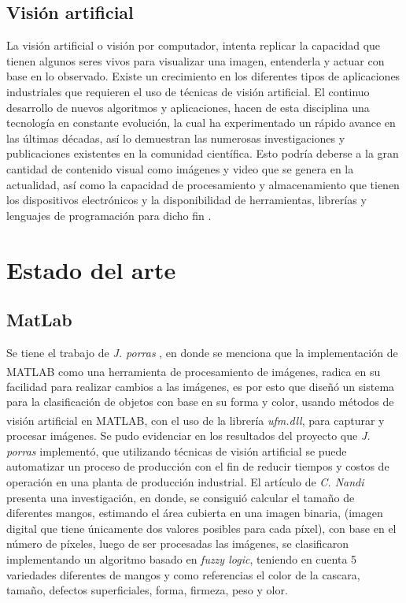 \section{Visión artificial} La visión artificial o visión por computador, intenta replicar la capacidad que tienen algunos seres vivos para visualizar una imagen, entenderla y actuar con base en lo observado. Existe un crecimiento en los diferentes tipos de aplicaciones industriales que requieren el uso de técnicas de visión artificial. El  continuo  desarrollo  de  nuevos  algoritmos  y  aplicaciones,  hacen  de  esta  disciplina  una tecnología en constante evolución, la cual ha experimentado un rápido avance en las últimas décadas, así lo demuestran las numerosas investigaciones y publicaciones existentes en la comunidad científica.  Esto podría deberse a la gran cantidad de contenido visual como imágenes y video que se genera en  la  actualidad,  así  como  la  capacidad  de  procesamiento  y  almacenamiento  que  tienen  los dispositivos electrónicos y la disponibilidad de herramientas, librerías y lenguajes de programación para dicho fin \cite{ref_15}.






\chapter{Estado del arte}

\section{MatLab}

Se tiene el trabajo de \textit{J. porras} \cite{article3}, en donde se menciona que la implementación de MATLAB\textsuperscript{\textregistered} como una herramienta de procesamiento de imágenes, radica en su facilidad para realizar cambios a las imágenes, es por esto que diseñó un sistema para la clasificación de objetos con base en su forma y color, usando métodos de visión artificial en MATLAB\textsuperscript{\textregistered}, con el uso de la librería \textit{ufm.dll}, para capturar y procesar imágenes. Se pudo evidenciar en los resultados del proyecto que \textit{J. porras} implementó, que utilizando técnicas de visión artificial se puede automatizar un proceso de producción con el fin de reducir tiempos y costos de operación en una planta de producción industrial. El artículo de \textit{C. Nandi} \cite{inproceedings} presenta una investigación, en donde, se consiguió calcular el tamaño de diferentes mangos, estimando el área cubierta en una imagen binaria, (imagen digital que tiene únicamente dos valores posibles para cada píxel), con base en el número de píxeles, luego de ser procesadas las imágenes, se clasificaron implementando un algoritmo basado en \textit{fuzzy logic}, teniendo en cuenta 5 variedades diferentes de mangos y como referencias el color de la cascara, tamaño, defectos superficiales, forma, firmeza, peso y olor.\\

